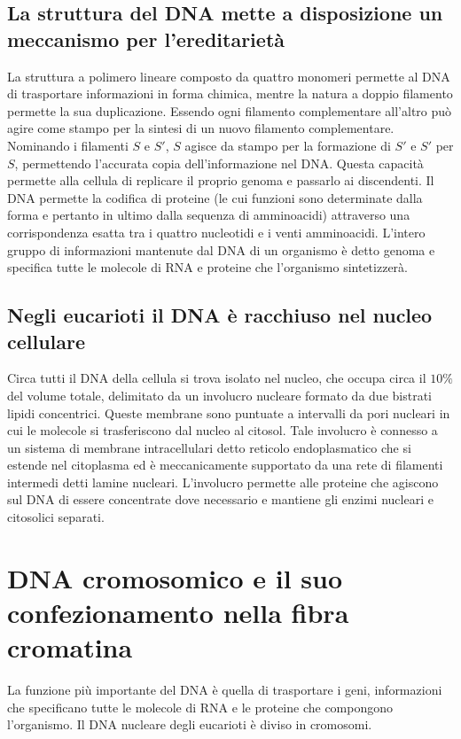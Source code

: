 \subsection{La struttura del DNA mette a disposizione un meccanismo per l'ereditariet\`a}
La struttura a polimero lineare composto da quattro monomeri permette al DNA di trasportare informazioni in forma chimica, mentre la natura a doppio filamento permette la sua 
duplicazione. Essendo ogni filamento complementare all'altro pu\`o agire come stampo per la sintesi di un nuovo filamento complementare. Nominando i filamenti $S$ e $S'$, $S$ agisce
da stampo per la formazione di $S'$ e $S'$ per $S$, permettendo l'accurata copia dell'informazione nel DNA. Questa capacit\`a permette alla cellula di replicare il proprio genoma
e passarlo ai discendenti. Il DNA permette la codifica di proteine (le cui funzioni sono determinate dalla forma e pertanto in ultimo dalla sequenza di amminoacidi) attraverso una
corrispondenza esatta tra i quattro nucleotidi e i venti amminoacidi. L'intero gruppo di informazioni mantenute dal DNA di un organismo \`e detto genoma e specifica tutte le molecole
di RNA e proteine che l'organismo sintetizzer\`a. 
\subsection{Negli eucarioti il DNA \`e racchiuso nel nucleo cellulare}
Circa tutti il DNA della cellula si trova isolato nel nucleo, che occupa circa il $10\%$ del volume totale, delimitato da un involucro nucleare formato da due bistrati lipidi 
concentrici. Queste membrane sono puntuate a intervalli da pori nucleari in cui le molecole si trasferiscono dal nucleo al citosol. Tale involucro \`e connesso a un sistema di 
membrane intracellulari detto reticolo endoplasmatico che si estende nel citoplasma ed \`e meccanicamente supportato da una rete di filamenti intermedi detti lamine nucleari. L'involucro
permette alle proteine che agiscono sul DNA di essere concentrate dove necessario e mantiene gli enzimi nucleari e citosolici separati. 
\section{DNA cromosomico e il suo confezionamento nella fibra cromatina}
La funzione pi\`u importante del DNA \`e quella di trasportare i geni, informazioni che specificano tutte le molecole di RNA e le proteine che compongono l'organismo. Il DNA nucleare 
degli eucarioti \`e diviso in cromosomi. 
